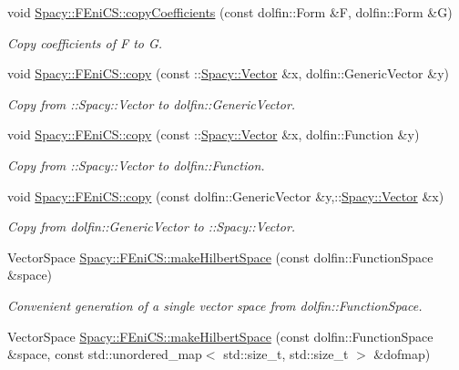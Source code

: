 \begin{DoxyCompactItemize}
\item 
void \hyperlink{group__FenicsGroup_gab3d4c7c1e91a50e4e816598258b6edce}{Spacy\+::\+F\+Eni\+C\+S\+::copy\+Coefficients} (const dolfin\+::\+Form \&F, dolfin\+::\+Form \&G)
\begin{DoxyCompactList}\small\item\em Copy coefficients of F to G. \end{DoxyCompactList}\item 
void \hyperlink{group__FenicsGroup_ga7f43f0c660d0646adb031b453c536bb0}{Spacy\+::\+F\+Eni\+C\+S\+::copy} (const \+::\hyperlink{classSpacy_1_1Vector}{Spacy\+::\+Vector} \&x, dolfin\+::\+Generic\+Vector \&y)
\begin{DoxyCompactList}\small\item\em Copy from \+:\+:Spacy\+:\+:Vector to dolfin\+::\+Generic\+Vector. \end{DoxyCompactList}\item 
void \hyperlink{group__FenicsGroup_ga28fb1ebae29e07ec0256bb2331599aa7}{Spacy\+::\+F\+Eni\+C\+S\+::copy} (const \+::\hyperlink{classSpacy_1_1Vector}{Spacy\+::\+Vector} \&x, dolfin\+::\+Function \&y)
\begin{DoxyCompactList}\small\item\em Copy from \+:\+:Spacy\+:\+:Vector to dolfin\+::\+Function. \end{DoxyCompactList}\item 
void \hyperlink{group__FenicsGroup_ga61c5e45dbb789c155fbf86f8ec288f17}{Spacy\+::\+F\+Eni\+C\+S\+::copy} (const dolfin\+::\+Generic\+Vector \&y,\+::\hyperlink{classSpacy_1_1Vector}{Spacy\+::\+Vector} \&x)
\begin{DoxyCompactList}\small\item\em Copy from dolfin\+::\+Generic\+Vector to \+:\+:Spacy\+:\+:Vector. \end{DoxyCompactList}\item 
Vector\+Space \hyperlink{group__FenicsGroup_ga89defe8c7e08ab224af2a3cd0445e254}{Spacy\+::\+F\+Eni\+C\+S\+::make\+Hilbert\+Space} (const dolfin\+::\+Function\+Space \&space)
\begin{DoxyCompactList}\small\item\em Convenient generation of a single vector space from dolfin\+::\+Function\+Space. \end{DoxyCompactList}\item 
Vector\+Space \hyperlink{group__FenicsGroup_ga1aaf48bfbd005bee810090a01404ab4a}{Spacy\+::\+F\+Eni\+C\+S\+::make\+Hilbert\+Space} (const dolfin\+::\+Function\+Space \&space, const std\+::unordered\+\_\+map$<$ std\+::size\+\_\+t, std\+::size\+\_\+t $>$ \&dofmap)

\end{DoxyCompactItemize}
